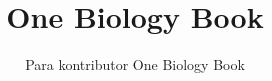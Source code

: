 \documentclass[11pt,a4paper,twoside,openany]{book}
\title{One Biology Book}
\author{Para kontributor One Biology Book}
\date{\bookdate}
\begin{document}
\frontmatter




\tableofcontents

\mainmatter



\appendix
\part{\omsolutionspart}


\backmatter
\printindex
\end{document}
